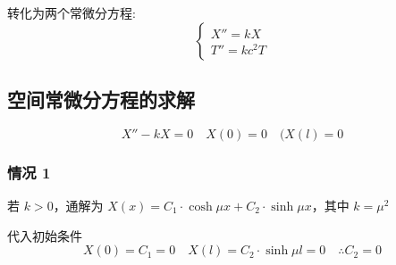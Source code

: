 \documentclass[12pt,a4paper]{article}
\numberwithin{subsection}{section}   %
\numberwithin{subsubsection}{subsection}
\theoremstyle{plain}
\theoremstyle{definition}
\theoremstyle{remark}
\theoremstyle{verification}
\begin{document}
	转化为两个常微分方程:
	\begin{equation} \label{eq:ode}
		\begin{cases}
			X'' = kX \\
			T'' = k c^2 T
		\end{cases}
	\end{equation}
	
	\subsection{空间常微分方程的求解}
	\begin{equation}
		X'' - kX = 0 \quad X(0) = 0 \quad (X(l) = 0
	\end{equation}
	
	\subsubsection{情况 1}
	若 \(k > 0\)，通解为 \(X(x) = C_1 \cdot \cosh \mu x + C_2 \cdot \sinh \mu x\)，其中 \(k = \mu^2\)
	
	代入初始条件 
	\begin{equation}
		X(0) = C_1 = 0 \quad X(l) = C_2 \cdot \sinh \mu l = 0 \quad \therefore C_2 = 0
	\end{equation}
	
\end{document}
